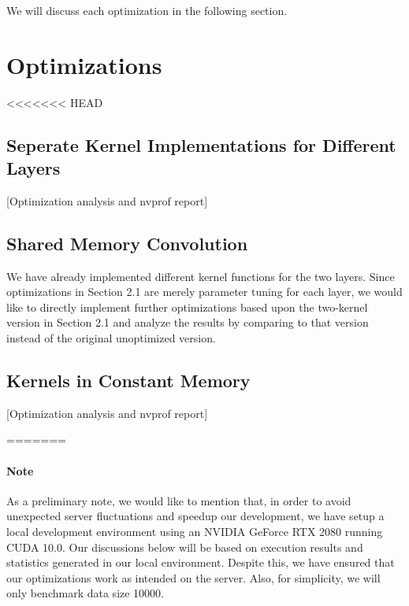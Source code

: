 \documentclass{article}
\begin{document}
We will discuss each optimization in the following section.

\section{Optimizations}

<<<<<<< HEAD
\subsection{Seperate Kernel Implementations for Different Layers}
[Optimization analysis and nvprof report]

\subsection{Shared Memory Convolution}
We have already implemented different kernel functions for the two layers. Since optimizations in Section 2.1
are merely parameter tuning for each layer, we would like to directly implement further optimizations based
upon the two-kernel version in Section 2.1 and analyze the results by comparing to that version instead of
the original unoptimized version. 

\subsection{Kernels in Constant Memory}
[Optimization analysis and nvprof report]

=======
\paragraph{Note}
As a preliminary note, we would like to mention that, in order to avoid unexpected server fluctuations and speedup our development,
we have setup a local development environment using an NVIDIA GeForce RTX 2080 running CUDA 10.0. Our discussions below will be based on
execution results and statistics generated in our local environment. Despite this, we have ensured that our optimizations work as
intended on the server. Also, for simplicity, we will only benchmark data size 10000.
\end{document}
